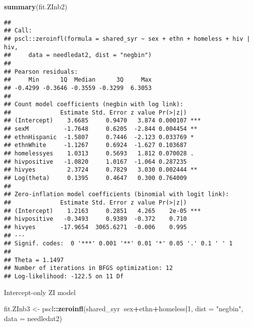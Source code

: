 \documentclass[
  ignorenonframetext,
]{beamer}
\newenvironment{Shaded}{\begin{snugshade}}{\end{snugshade}}
\newcommand{\DataTypeTok}[1]{\textcolor[rgb]{0.13,0.29,0.53}{#1}}
\newcommand{\DecValTok}[1]{\textcolor[rgb]{0.00,0.00,0.81}{#1}}
\newcommand{\KeywordTok}[1]{\textcolor[rgb]{0.13,0.29,0.53}{\textbf{#1}}}
\newcommand{\NormalTok}[1]{#1}
\newcommand{\OperatorTok}[1]{\textcolor[rgb]{0.81,0.36,0.00}{\textbf{#1}}}
\newcommand{\StringTok}[1]{\textcolor[rgb]{0.31,0.60,0.02}{#1}}
\begin{document}
\begin{frame}[fragile]{}
\protect\hypertarget{section-3}{}

\tiny

\begin{Shaded}
\begin{Highlighting}[]
\KeywordTok{summary}\NormalTok{(fit.ZInb2)}
\end{Highlighting}
\end{Shaded}

\begin{verbatim}
## 
## Call:
## pscl::zeroinfl(formula = shared_syr ~ sex + ethn + homeless + hiv | hiv, 
##     data = needledat2, dist = "negbin")
## 
## Pearson residuals:
##     Min      1Q  Median      3Q     Max 
## -0.4299 -0.3646 -0.3559 -0.3299  6.3053 
## 
## Count model coefficients (negbin with log link):
##              Estimate Std. Error z value Pr(>|z|)    
## (Intercept)    3.6685     0.9470   3.874 0.000107 ***
## sexM          -1.7648     0.6205  -2.844 0.004454 ** 
## ethnHispanic  -1.5807     0.7446  -2.123 0.033769 *  
## ethnWhite     -1.1267     0.6924  -1.627 0.103687    
## homelessyes    1.0313     0.5693   1.812 0.070028 .  
## hivpositive   -1.0820     1.0167  -1.064 0.287235    
## hivyes         2.3724     0.7829   3.030 0.002444 ** 
## Log(theta)     0.1395     0.4647   0.300 0.764009    
## 
## Zero-inflation model coefficients (binomial with logit link):
##              Estimate Std. Error z value Pr(>|z|)    
## (Intercept)    1.2163     0.2851   4.265    2e-05 ***
## hivpositive   -0.3493     0.9389  -0.372    0.710    
## hivyes       -17.9654  3065.6271  -0.006    0.995    
## ---
## Signif. codes:  0 '***' 0.001 '**' 0.01 '*' 0.05 '.' 0.1 ' ' 1 
## 
## Theta = 1.1497 
## Number of iterations in BFGS optimization: 12 
## Log-likelihood: -122.5 on 11 Df
\end{verbatim}

\end{frame}

\begin{frame}[fragile]{Intercept-only ZI model}
\protect\hypertarget{intercept-only-zi-model}{}

\begin{Shaded}
\begin{Highlighting}[]
\NormalTok{fit.ZInb3 <-}
\StringTok{  }\NormalTok{pscl}\OperatorTok{::}\KeywordTok{zeroinfl}\NormalTok{(shared_syr}\OperatorTok{~}\NormalTok{sex}\OperatorTok{+}\NormalTok{ethn}\OperatorTok{+}\NormalTok{homeless}\OperatorTok{|}\DecValTok{1}\NormalTok{,}
           \DataTypeTok{dist =} \StringTok{"negbin"}\NormalTok{,}
           \DataTypeTok{data =}\NormalTok{ needledat2)}
\end{Highlighting}
\end{Shaded}

\end{frame}
\end{document}
